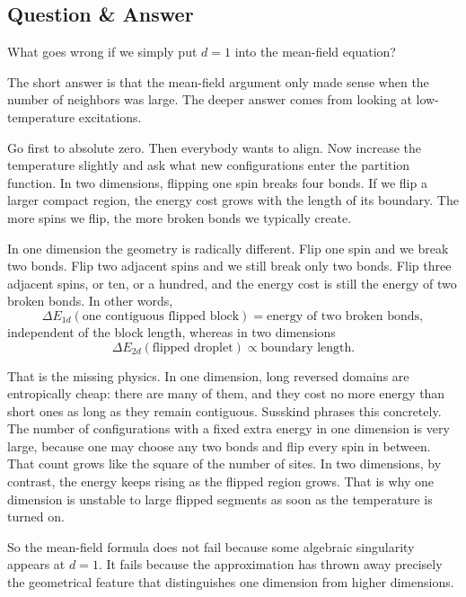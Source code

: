 \subsection{Question \& Answer}

What goes wrong if we simply put \(d=1\) into the mean-field equation?

The short answer is that the mean-field argument only made sense when the number of neighbors was large. The deeper answer comes from looking at low-temperature excitations.

Go first to absolute zero. Then everybody wants to align. Now increase the temperature slightly and ask what new configurations enter the partition function. In two dimensions, flipping one spin breaks four bonds. If we flip a larger compact region, the energy cost grows with the length of its boundary. The more spins we flip, the more broken bonds we typically create.

In one dimension the geometry is radically different. Flip one spin and we break two bonds. Flip two adjacent spins and we still break only two bonds. Flip three adjacent spins, or ten, or a hundred, and the energy cost is still the energy of two broken bonds. In other words,
\begin{equation}
\Delta E_{1d}(\text{one contiguous flipped block})
=\text{energy of two broken bonds},
\end{equation}
independent of the block length, whereas in two dimensions
\begin{equation}
\Delta E_{2d}(\text{flipped droplet})\propto \text{boundary length}.
\end{equation}

That is the missing physics. In one dimension, long reversed domains are entropically cheap: there are many of them, and they cost no more energy than short ones as long as they remain contiguous. Susskind phrases this concretely. The number of configurations with a fixed extra energy in one dimension is very large, because one may choose any two bonds and flip every spin in between. That count grows like the square of the number of sites. In two dimensions, by contrast, the energy keeps rising as the flipped region grows. That is why one dimension is unstable to large flipped segments as soon as the temperature is turned on.

So the mean-field formula does not fail because some algebraic singularity appears at \(d=1\). It fails because the approximation has thrown away precisely the geometrical feature that distinguishes one dimension from higher dimensions.

